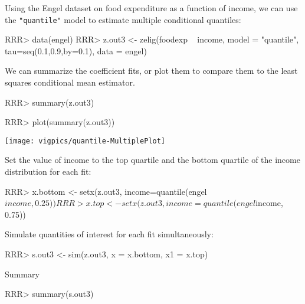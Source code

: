 \begin{enumerate}
Using the Engel dataset on food expenditure as a function of income, we can use the
{\tt "quantile"} model to estimate multiple conditional quantiles: 
\begin{Schunk}
\begin{Sinput}
RRR>  data(engel)
RRR>  z.out3 <- zelig(foodexp ~ income, model = "quantile", tau=seq(0.1,0.9,by=0.1), data = engel)
\end{Sinput}
\end{Schunk}
We can summarize the coefficient fits, or plot them to compare them to the least squares
conditional mean estimator.
\begin{Schunk}
\begin{Sinput}
RRR>  summary(z.out3)
\end{Sinput}
\end{Schunk}
\begin{center}
\begin{Schunk}
\begin{Sinput}
RRR>  plot(summary(z.out3))
\end{Sinput}
\end{Schunk}
\texttt{[image: vigpics/quantile-MultiplePlot]}
\end{center}
Set the value of income to the top quartile and the bottom quartile of 
the income distribution for each fit:
\begin{Schunk}
\begin{Sinput}
RRR>  x.bottom <- setx(z.out3, income=quantile(engel$income, 0.25))
RRR>  x.top <- setx(z.out3, income=quantile(engel$income, 0.75))
\end{Sinput}
\end{Schunk}
Simulate quantities of interest for each fit simultaneously:
\begin{Schunk}
\begin{Sinput}
RRR>  s.out3 <- sim(z.out3, x = x.bottom, x1 = x.top)
\end{Sinput}
\end{Schunk}
Summary
\begin{Schunk}
\begin{Sinput}
RRR> summary(s.out3)
\end{Sinput}
\end{Schunk}

\end{enumerate}

